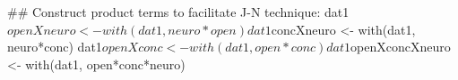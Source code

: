 \begin{Schunk}
\begin{Sinput}
 ## Construct product terms to facilitate J-N technique:
 dat1$openXneuro <- with(dat1, neuro*open)
 dat1$concXneuro <- with(dat1, neuro*conc)
 dat1$openXconc <- with(dat1, open*conc)
 dat1$openXconcXneuro <- with(dat1, open*conc*neuro)
\end{Sinput}
\end{Schunk}
